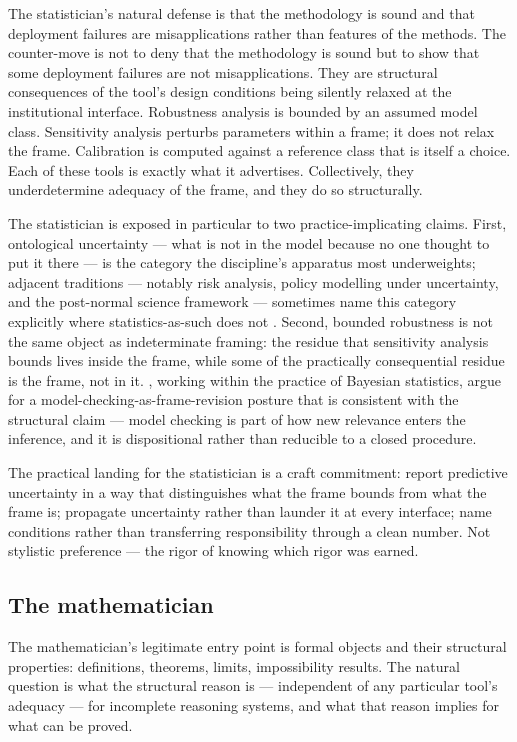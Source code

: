 \documentclass[11pt,a4paper]{article}
\begin{document}
The statistician's natural defense is that the methodology is sound and
that deployment failures are misapplications rather than features of the
methods. The counter-move is not to deny that the methodology is sound
but to show that some deployment failures are not misapplications. They
are structural consequences of the tool's design conditions being
silently relaxed at the institutional interface. Robustness analysis is
bounded by an assumed model class. Sensitivity analysis perturbs
parameters within a frame; it does not relax the frame. Calibration is
computed against a reference class that is itself a choice. Each of
these tools is exactly what it advertises. Collectively, they
underdetermine adequacy of the frame, and they do so structurally.

The statistician is exposed in particular to two practice-implicating
claims. First, ontological uncertainty --- what is not in the model
because no one thought to put it there --- is the category the
discipline's apparatus most underweights; adjacent traditions ---
notably risk analysis, policy modelling under uncertainty, and the
post-normal science framework --- sometimes name this category
explicitly where statistics-as-such does not
\citep{Wynne1992,Walker2003,FuntowiczRavetz1990}.
Second, bounded robustness is not the same object as indeterminate
framing: the residue that sensitivity analysis bounds lives inside the
frame, while some of the practically consequential residue is the frame,
not in it. \citet{GelmanShalizi2013}, working within the practice of
Bayesian statistics, argue for a model-checking-as-frame-revision posture
that is consistent with the structural claim --- model checking is part
of how new relevance enters the inference, and it is dispositional rather
than reducible to a closed procedure.

The practical landing for the statistician is a craft commitment: report
predictive uncertainty in a way that distinguishes what the frame bounds
from what the frame is; propagate uncertainty rather than launder it at
every interface; name conditions rather than transferring responsibility
through a clean number. Not stylistic preference --- the rigor of knowing
which rigor was earned.

\subsection{The mathematician}
\label{sec:mathematician}

The mathematician's legitimate entry point is formal objects and their
structural properties: definitions, theorems, limits, impossibility
results. The natural question is what the structural reason is ---
independent of any particular tool's adequacy --- for incomplete
reasoning systems, and what that reason implies for what can be proved.
\end{document}
